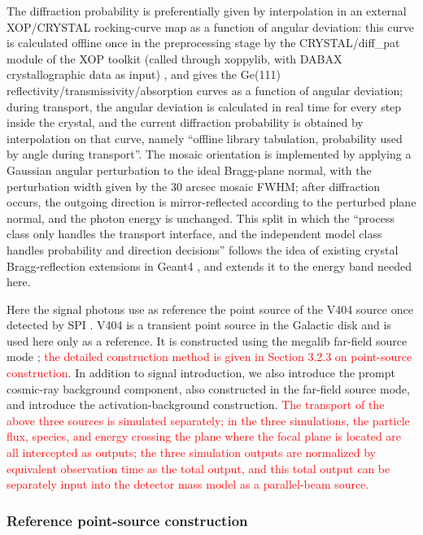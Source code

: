 \documentclass[pdflatex,sn-mathphys-num]{sn-jnl}
\begin{document}
The diffraction probability is preferentially given by interpolation in an external XOP/CRYSTAL rocking-curve map as a function of angular deviation: this curve is calculated offline once in the preprocessing stage by the CRYSTAL/diff\_pat module of the XOP toolkit (called through xoppylib, with DABAX crystallographic data as input) \cite{SanchezDelRio2011XOP}, and gives the Ge(111) reflectivity/transmissivity/absorption curves as a function of angular deviation; during transport, the angular deviation is calculated in real time for every step inside the crystal, and the current diffraction probability is obtained by interpolation on that curve, namely ``offline library tabulation, probability used by angle during transport''. The mosaic orientation is implemented by applying a Gaussian angular perturbation to the ideal Bragg-plane normal, with the perturbation width given by the 30 arcsec mosaic FWHM; after diffraction occurs, the outgoing direction is mirror-reflected according to the perturbed plane normal, and the photon energy is unchanged. This split in which the ``process class only handles the transport interface, and the independent model class handles probability and direction decisions'' follows the idea of existing crystal Bragg-reflection extensions in Geant4 \cite{Guan2023BraggReflection,Reiazi2025G4BraggReflection}, and extends it to the energy band needed here.

Here the signal photons use as reference the point source of the V404 source once detected by SPI \cite{Siegert2016V404}. V404 is a transient point source in the Galactic disk and is used here only as a reference. It is constructed using the megalib far-field source mode \cite{Zoglauer2006}; \textcolor{red}{the detailed construction method is given in Section 3.2.3 on point-source construction}. In addition to signal introduction, we also introduce the prompt cosmic-ray background component, also constructed in the far-field source mode, and introduce the activation-background construction. \textcolor{red}{The transport of the above three sources is simulated separately; in the three simulations, the particle flux, species, and energy crossing the plane where the focal plane is located are all intercepted as outputs; the three simulation outputs are normalized by equivalent observation time as the total output, and this total output can be separately input into the detector mass model as a parallel-beam source.}

\subsubsection{Reference point-source construction}
\label{subsec:pointsource}
\end{document}
